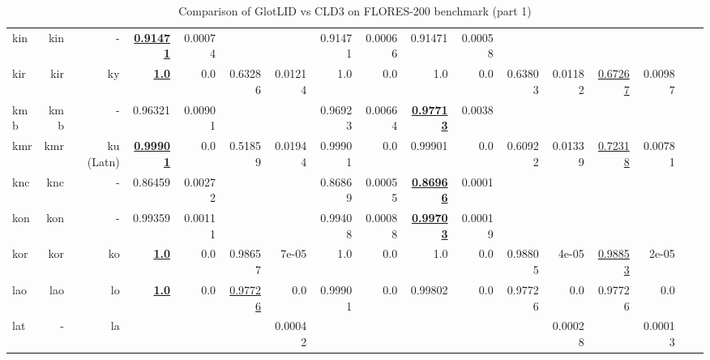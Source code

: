 \documentclass[11pt]{article}
\def\flores{FLORES\xspace}
\begin{document}
\begin{table*}[h]
{\begin{tabular}{lrrrrrrrrrrrrrrrr}
kin         & kin         & -         & \textbf{\underline{0.91471}}         & 0.00074         &          &          & 0.91471         & 0.00066         & 0.91471         & 0.00058         &          &          &          &          \\
kir         & kir         & ky         & \textbf{\underline{1.0}}         & 0.0         & 0.63286         & 0.01214         & 1.0         & 0.0         & 1.0         & 0.0         & 0.63803         & 0.01182         & \underline{0.67267}         & 0.00987         \\
kmb         & kmb         & -         & 0.96321         & 0.00901         &          &          & 0.96923         & 0.00664         & \textbf{\underline{0.97713}}         & 0.0038         &          &          &          &          \\
kmr         & kmr         & ku (Latn)         & \textbf{\underline{0.99901}}         & 0.0         & 0.51859         & 0.01944         & 0.99901         & 0.0         & 0.99901         & 0.0         & 0.60922         & 0.01339         & \underline{0.72318}         & 0.00781         \\
knc         & knc         & -         & 0.86459         & 0.00272         &          &          & 0.86869         & 0.00055         & \textbf{\underline{0.86966}}         & 0.0001         &          &          &          &          \\
kon         & kon         & -         & 0.99359         & 0.00111         &          &          & 0.99408         & 0.00088         & \textbf{\underline{0.99703}}         & 0.00019         &          &          &          &          \\
kor         & kor         & ko         & \textbf{\underline{1.0}}         & 0.0         & 0.98657         & 7e-05         & 1.0         & 0.0         & 1.0         & 0.0         & 0.98805         & 4e-05         & \underline{0.98853}         & 2e-05         \\
lao         & lao         & lo         & \textbf{\underline{1.0}}         & 0.0         & \underline{0.97726}         & 0.0         & 0.99901         & 0.0         & 0.99802         & 0.0         & 0.97726         & 0.0         & 0.97726         & 0.0         \\
lat         & -         & la         &          &          &          & 0.00042         &          &          &          &          &          & 0.00028         &          & 0.00013         \\
\end{tabular}
}
\caption{Comparison of GlotLID vs CLD3 on \flores-200 benchmark (part 1)}
\label{tab:appendix_glotlid_cld3_floress_1}
\end{table*}
\end{document}
